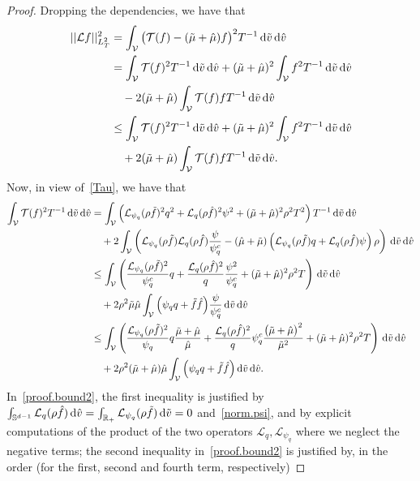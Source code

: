 \documentclass[a4paper]{article}
\theoremstyle{Theorem}\newtheorem{proposition}{Proposition}[section]
\theoremstyle{Remark}\newtheorem{remark}{Remark}[section]
\theoremstyle{Theorem}\newtheorem{theorem}{Theorem}[section]
\newcommand{\R}{\mathbb{R}}
\newcommand{\hv}{\hat{v}}
\newcommand{\tv}{\tilde{v}}
\newcommand{\hf}{\hat{f}}
\newcommand{\tf}{\tilde{f}}
\newcommand{\hmu}{\hat{\mu}}
\newcommand{\tmu}{\tilde{\mu}}
\newcommand{\intS}{\int_{\mathbb{S}^{d-1}}}
\newcommand{\intR}{\int_{\R_+}}
\newcommand{\intV}{\int_{\mathcal{V}}}
\begin{document}
\begin{proof}
Dropping the dependencies, we have that
 \begin{equation}\label{proof.bound1}
 \begin{split}
 || \mathcal{L}f||^2_{L^2_T} &= \intV \big(\mathcal{T}(f) -(\tmu +\hmu)f \big)^2 T^{-1} \, {\rm d} \tv \, {\rm d}\hv\\ &= \intV \mathcal{T}(f)^2 T^{-1} \, {\rm d} \tv \, {\rm d}\hv + (\tmu +\hmu)^2\intV f^2 T^{-1}\, {\rm d} \tv \, {\rm d}\hv\\ &\quad-2  (\tmu +\hmu) \intV \mathcal{T}(f) f T^{-1}   \, {\rm d} \tv \, {\rm d}\hv\\
 &\le \intV \mathcal{T}(f)^2 T^{-1} \, {\rm d} \tv \, {\rm d}\hv + (\tmu +\hmu)^2\intV f^2 T^{-1}\, {\rm d} \tv \, {\rm d}\hv\\ &\quad+2(\tmu +\hmu) \intV \mathcal{T}(f) f T^{-1} \, {\rm d} \tv \, {\rm d}\hv.
 \end{split}
 \end{equation} 
 Now, in view of~\eqref{Tau}, we have that
 \begin{equation}\label{proof.bound2}
 \begin{split}
 \intV \mathcal{T}(f)^2 T^{-1} \, {\rm d} \tv \, {\rm d}\hv&= \intV \left(\mathcal{L}_{\psi_q}(\rho \tf)^2 q^2 +\mathcal{L}_q(\rho \hf)^2 \psi^2 +(\tmu+\hmu)^2 \rho^2T^2 \right)T^{-1} \, {\rm d} \tv \, {\rm d}\hv\\
 &\quad +2\intV \left( \mathcal{L}_{\psi_q}(\rho\tf)\mathcal{L}_q(\rho \hf)\dfrac{\psi}{\psi_q^c}-(\hmu+\tmu) \left(\mathcal{L}_{\psi_q}(\rho\tf)q + \mathcal{L}_q(\rho\hf)\psi\right)\rho\right)\, {\rm d} \tv \, {\rm d}\hv \\
 &\le  \intV \left(\dfrac{\mathcal{L}_{\psi_q}(\rho \tf)^2}{\psi_q^c}q + \dfrac{\mathcal{L}_q(\rho \hf)^2}{q} \dfrac{\psi^2}{\psi_q^c} +(\tmu+\hmu)^2\rho^2 T \right) \, {\rm d} \tv \, {\rm d}\hv\\
 &\quad+2\rho^2\tmu\hmu\intV \Big(\psi_qq +\tf \hf\Big)\dfrac{\psi}{\psi_q^c} \, {\rm d} \tv \, {\rm d}\hv \\
\ &\le \intV \left( \dfrac{\mathcal{L}_{\psi_q}(\rho \tf)^2}{\psi_q}q\dfrac{\tmu+\hmu}{\hmu}  +\dfrac{\mathcal{L}_q(\rho \hf)^2}{q} \psi_q^c\dfrac{\big(\tmu+\hmu\big)^2}{\tmu^2} +(\tmu+\hmu)^2\rho^2T \right) \, {\rm d} \tv \, {\rm d}\hv\\
&\quad+2\rho^2(\tmu+\hmu)\hmu\intV \Big(\psi_qq +\tf \hf\Big)\, {\rm d} \tv \, {\rm d}\hv.
 \end{split}
 \end{equation}
 In~\eqref{proof.bound2}, the first inequality is justified by $\intS\mathcal{L}_q(\rho \hf)\, {\rm d}\hv = \intR\mathcal{L}_{\psi_q}(\rho\tf)\, {\rm d}\tv = 0$ and~\eqref{norm.psi}, and by explicit computations of the product of the two operators $\mathcal{L}_q,\mathcal{L}_{\psi_q}$ where we neglect the negative terms; the second inequality in~\eqref{proof.bound2} is justified by, in the order (for the first, second and fourth term, respectively)

\end{proof}
\end{document}
